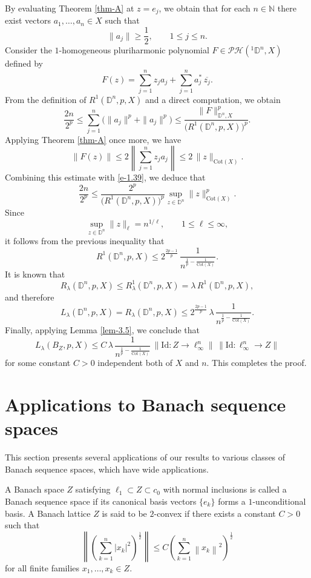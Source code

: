 \documentclass[a4paper,11pt, reqno]{amsart}
\theoremstyle{definition}
\newcounter {own}
\newcommand{\norm}[1]{\left\lVert#1\right\rVert}
\begin{document}
\medskip
By evaluating Theorem \ref{thm-A} at $z=e_j$, we obtain that for each $n \in \mathbb{N}$ there exist vectors $a_{1}, \ldots, a_{n} \in X$ such that \[ \|a_{j}\| \geq \frac{1}{2}, \qquad 1\leq j \leq n. \] Consider the $1$-homogeneous pluriharmonic polynomial $F \in \mathcal{PH}(^1\mathbb{D}^n,X)$ defined by 
\[ F(z)=\sum_{j=1}^{n} z_{j}a_{j} + \sum_{j=1}^{n} a^{*}_{j}\,\overline{z_{j}}. 
\] From the definition of $R^{1}(\mathbb{D}^n,p,X)$ and a direct computation, we obtain \begin{equation}\label{e-1.39} \frac{2n}{2^{p}} \leq \sum_{j=1}^{n} \bigl(\|a_{j}\|^{p}+\|a_{j}\|^{p}\bigr) \leq \frac{\|F\|^{p}_{\mathbb{D}^n,X}} {\bigl(R^{1}(\mathbb{D}^n,p,X)\bigr)^{p}}. 
\end{equation} 
Applying Theorem \ref{thm-A} once more, we have \[ \|F(z)\| \leq 2 \left\| \sum_{j=1}^{n} z_{j}a_{j} \right\| \leq 2\,\|z\|_{\mathrm{Cot}(X)}. \]
 Combining this estimate with \eqref{e-1.39}, we deduce that \[ \frac{2n}{2^{p}} \leq \frac{2^{p}} {\bigl(R^{1}(\mathbb{D}^n,p,X)\bigr)^{p}} \sup_{z\in \mathbb{D}^n} \|z\|_{\mathrm{Cot}(X)}^{p}. \] Since \[ \sup_{z\in \mathbb{D}^n}\|z\|_{\ell} = n^{1/\ell}, \qquad 1\leq \ell \leq \infty, \] it follows from the previous inequality that \[ R^{1}(\mathbb{D}^n,p,X) \leq 2^{\frac{2p-1}{p}}\, \frac{1}{n^{\frac{1}{p}-\frac{1}{\mathrm{Cot}(X)}}}. \] It is known that \[ R_{\lambda}(\mathbb{D}^n,p,X) \leq R^{1}_{\lambda}(\mathbb{D}^n,p,X) =\lambda\,R^{1}(\mathbb{D}^n,p,X), \] and therefore \[ L_{\lambda}(\mathbb{D}^n,p,X) = R_{\lambda}(\mathbb{D}^n,p,X) \leq 2^{\frac{2p-1}{p}}\, \lambda\, \frac{1}{n^{\frac{1}{p}-\frac{1}{\mathrm{Cot}(X)}}}. \] Finally, applying Lemma \ref{lem-3.5}, we conclude that \[ L_{\lambda}(B_Z,p,X) \leq C\,\lambda\, \frac{1}{n^{\frac{1}{p}-\frac{1}{\mathrm{Cot}(X)}}} \,\| \mathrm{Id}: Z \to \ell_\infty^n \|\, \|\mathrm{Id}: \ell_\infty^n \to Z\| \] 
 for some constant $C>0$ independent both of $X$ and $n$. This completes the proof.
\section{Applications to Banach sequence spaces}
This section presents several applications of our results to various classes of Banach sequence spaces, which have wide applications.

\medskip
A Banach space $Z$ satisfying $\ell_1 \subset Z \subset c_{0}$ with normal inclusions is called a Banach sequence space if its canonical basis vectors $\{e_{k}\}$ forms a $1$-unconditional basis. A Banach lattice $Z$ is said to be $2$-convex if there exists a constant $C>0$ such that 
$$\norm{\left(\sum_{k=1}^{n}|x_{k}|^2\right)^{\frac{1}{2}}} \leq C 	\left(\sum_{k=1}^{n}\norm{x_{k}}^2\right)^{\frac{1}{2}}
$$
for all finite families $x_{1}, \ldots, x_{k} \in Z$. 
\end{document}
